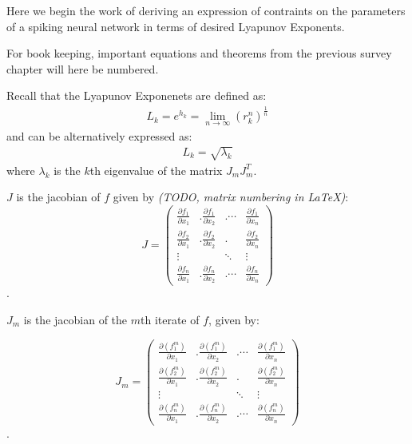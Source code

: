 \documentclass{elsart1p}
\begin{document}
Here we begin the work of deriving an expression of contraints on the
parameters of a spiking neural network in terms of desired Lyapunov Exponents.

For book keeping, important equations and theorems
from the previous survey chapter will here be numbered.

Recall that the Lyapunov Exponenets are defined as:
\begin{eqnarray}
L_{k} = e^{h_{k}} = \lim \limits_{n \to \infty} (r_{k}^{n})^{\frac{1}{n}}
\end{eqnarray}
and can be alternatively expressed as:
\begin{eqnarray}
L_{k} = \sqrt{\lambda_{k}}
\end{eqnarray}
where $\lambda_{k}$ is the $k$th eigenvalue of the matrix $J_{m}J_{m}^{T}$.

$J$ is the jacobian of $f$ given by \textit{(TODO, matrix numbering in \LaTeX)}:
\[ J = \left( \begin{array}{cccc}
\frac{\partial f_{1}}{\partial x_{1}} &.
\frac{\partial f_{1}}{\partial x_{2}} &.
\cdots &
\frac{\partial f_{1}}{\partial x_{n}} \\
\frac{\partial f_{2}}{\partial x_{1}} &.
\frac{\partial f_{2}}{\partial x_{2}} &.
 &
\frac{\partial f_{2}}{\partial x_{n}} \\
\vdots & & \ddots & \vdots \\
\frac{\partial f_{n}}{\partial x_{1}} &.
\frac{\partial f_{n}}{\partial x_{2}} &.
\cdots &
\frac{\partial f_{n}}{\partial x_{n}} \end{array} \right)\].

$J_{m}$ is the jacobian of the $m$th iterate of $f$, given by:

\[ J_{m} = \left( \begin{array}{cccc}
\frac{\partial (f_{1}^{m})}{\partial x_{1}} &.
\frac{\partial (f_{1}^{m})}{\partial x_{2}} &.
\cdots &
\frac{\partial (f_{1}^{m})}{\partial x_{n}} \\
\frac{\partial (f_{2}^{m})}{\partial x_{1}} &.
\frac{\partial (f_{2}^{m})}{\partial x_{2}} &.
 &
\frac{\partial (f_{2}^{m})}{\partial x_{n}} \\
\vdots & & \ddots & \vdots \\
\frac{\partial (f_{n}^{m})}{\partial x_{1}} &.
\frac{\partial (f_{n}^{m})}{\partial x_{2}} &.
\cdots &
\frac{\partial (f_{n}^{m})}{\partial x_{n}} \end{array} \right)\].
\end{document}
